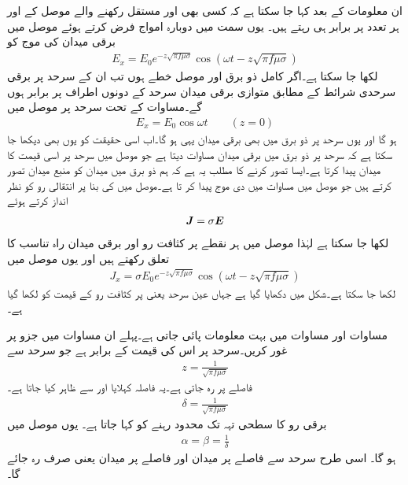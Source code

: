 ان معلومات کے بعد کہا جا سکتا ہے کہ کسی بھی اور  مستقل رکھنے والے موصل کے  اور  ہر تعدد پر برابر ہی رہتے ہیں۔ یوں  سمت میں دوبارہ امواج فرض کرتے ہوئے موصل میں برقی میدان کی موج کو
\begin{align}\label{مساوات_موج_موصل_موج}
E_x=E_0 e^{-z \sqrt{\pi f \mu \sigma}} \cos (\omega t - z \sqrt{\pi f \mu \sigma})
\end{align}
لکھا جا سکتا ہے۔اگر  کامل ذو برق اور  موصل خطے ہوں تب ان کے سرحد  پر برقی سرحدی شرائط کے مطابق متوازی برقی میدان سرحد کے دونوں اطراف پر برابر ہوں گے۔مساوات  کے تحت سرحد پر موصل میں
\begin{align}\label{مساوات_موج_موصل_ذو_برق_سرحد_موج}
E_x=E_0  \cos \omega t \quad  \quad (z=0)
\end{align}
ہو گا اور یوں سرحد پر ذو برق میں بھی برقی میدان یہی ہو گا۔اب اسی حقیقت کو یوں بھی دیکھا جا سکتا ہے کہ سرحد پر ذو برق میں برقی میدان مساوات  دیتا ہے جو موصل میں سرحد پر اسی قیمت کا میدان پیدا کرتا ہے۔ایسا تصور کرنے کا مطلب یہ ہے کہ ہم ذو برق میں میدان کو منبع میدان تصور کرتے ہیں جو موصل میں مساوات  میں دی موج پیدا کر تا ہے۔موصل میں  کی بنا پر انتقالی رو کو نظر انداز کرتے ہوئے
\begin{align}
{\ensuremath{{\boldsymbol{J}}}}=\sigma {\ensuremath{{\boldsymbol{E}}}}
\end{align}
لکھا جا سکتا ہے لہٰذا موصل میں ہر نقطے پر کثافت رو اور برقی میدان راہ تناسب کا تعلق رکھتے ہیں اور یوں موصل میں
\begin{align}\label{مساوات_موج_موصل_کثافت_رو_موج}
J_x=\sigma E_0 e^{-z \sqrt{\pi f \mu \sigma}} \cos (\omega t - z \sqrt{\pi f \mu \sigma})
\end{align}
لکھا جا سکتا ہے۔شکل  میں  دکھایا گیا ہے جہاں عین سرحد یعنی  پر کثافت رو کے قیمت  کو  لکھا گیا ہے۔

مساوات  اور مساوات  میں بہت معلومات پائی جاتی ہے۔پہلے ان مساوات میں
   جزو پر غور کریں۔سرحد پر اس کی قیمت  کے برابر ہے جو سرحد سے
\begin{align*}
z=\frac{1}{\sqrt{\pi f \mu \sigma}}
\end{align*}
فاصلے پر  رہ جاتی ہے۔یہ فاصلہ  کہلایا اور  سے ظاہر کیا جاتا ہے۔
\begin{align}
\delta =\frac{1}{\sqrt{\pi f \mu \sigma}}
\end{align}
برقی رو کا سطحی تہہ تک محدود رہنے کو  کہا جاتا ہے۔
یوں موصل میں
\begin{align}\label{مساوات_موج_گہرائی_جلد_کے_تعلق}
\alpha=\beta=\frac{1}{\delta}
\end{align}
ہو گا۔
اسی طرح سرحد سے  فاصلے پر میدان  اور   فاصلے پر میدان  یعنی صرف  رہ جائے گا۔

